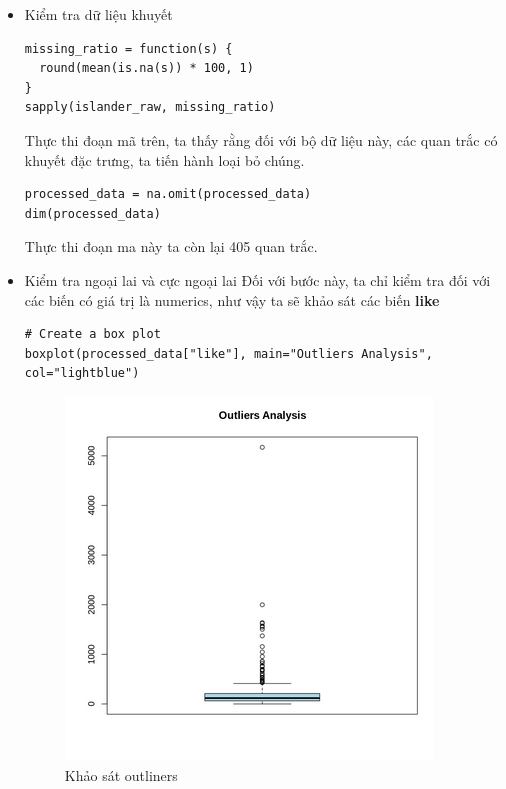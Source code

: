 \begin{itemize}
\begin{itemize}
            \item Kiểm tra dữ liệu khuyết
                \begin{lstlisting}
missing_ratio = function(s) {
  round(mean(is.na(s)) * 100, 1)
}
sapply(islander_raw, missing_ratio)
                \end{lstlisting}
                Thực thi đoạn mã trên, ta thấy rằng đối với bộ dữ liệu này, các quan trắc có khuyết đặc trưng, ta tiến hành loại bỏ chúng.
                \begin{lstlisting}
processed_data = na.omit(processed_data)
dim(processed_data)
                \end{lstlisting}
                Thực thi đoạn ma này ta còn lại 405 quan trắc.
            \item Kiểm tra ngoại lai và cực ngoại lai
                Đối với bước này, ta chỉ kiểm tra đối với các biến có giá trị là numerics, như vậy ta sẽ khảo sát các biến \textbf{like}
                \begin{lstlisting}
# Create a box plot
boxplot(processed_data["like"], main="Outliers Analysis", col="lightblue")
                \end{lstlisting}
                \begin{figure}[H]
                    \centering
                    \includegraphics[width=0.8\linewidth]{part23_figures/02.png}
                    \caption{Khảo sát outliners}
                    \label{fig:Khảo sát outliners}
                \end{figure}
                

\end{itemize}
\end{itemize}
